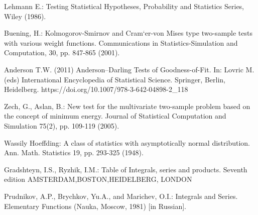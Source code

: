 \documentclass{svproc}
\begin{document}
\begin{thebibliography}{6}

Lehmann E.: Testing  Statistical  Hypotheses,  Probability  and  Statistics  Series,  Wiley (1986).

Buening, H.: Kolmogorov-Smirnov and Cram`er-von Mises type two-sample tests with various weight functions. Communications in Statistics-Simulation and Computation, 30, pp. 847-865 (2001).

Anderson T.W. (2011) Anderson–Darling Tests of Goodness-of-Fit. In: Lovric M. (eds) International Encyclopedia of Statistical Science. Springer, Berlin, Heidelberg. https://doi.org/10.1007/978-3-642-04898-2\_118

Zech, G., Aslan, B.: New test for the multivariate two-sample problem based on the concept of minimum energy. Journal of Statistical Computation and Simulation 75(2), pp. 109-119 (2005).

Wassily Hoeffding: A class of statistics with asymptotically normal distribution. Ann. Math. Statistics 19, pp. 293-325 (1948).

Gradshteyn, I.S., Ryzhik, I.M.: Table of Integrals, series and products. Seventh edition AMSTERDAM,BOSTON,HEIDELBERG, LONDON

Prudnikov, A.P., Brychkov, Yu.A., and Marichev, O.I.: Integrals and Series. Elementary Functions (Nauka, Moscow, 1981) [in Russian].

\end{thebibliography}
\end{document}
